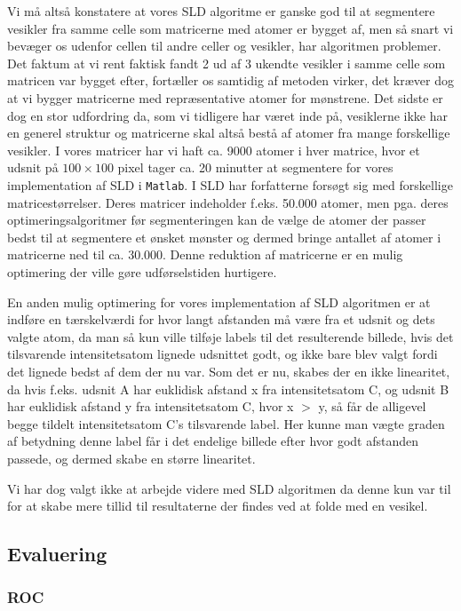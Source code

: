 Vi må altså konstatere at vores SLD algoritme er ganske god til at segmentere vesikler fra samme celle som matricerne med atomer er bygget af, men så snart vi bevæger os udenfor cellen til andre celler og vesikler, har algoritmen problemer. Det faktum at vi rent faktisk fandt 2 ud af 3 ukendte vesikler i samme celle som matricen var bygget efter, fortæller os samtidig af metoden virker, det kræver dog at vi bygger matricerne med repræsentative atomer for mønstrene. Det sidste er dog en stor udfordring da, som vi tidligere har været inde på, vesiklerne ikke har en generel struktur og matricerne skal altså bestå af atomer fra mange forskellige vesikler. I vores matricer har vi haft ca. 9000 atomer i hver matrice, hvor et udsnit på $100\times100$ pixel tager ca. 20 minutter at segmentere for vores implementation af SLD i \texttt{Matlab}. I SLD har forfatterne forsøgt sig med forskellige matricestørrelser. Deres matricer indeholder f.eks. 50.000 atomer, men pga. deres optimeringsalgoritmer før segmenteringen kan de vælge de atomer der passer bedst til at segmentere et ønsket mønster og dermed bringe antallet af atomer i matricerne ned til ca. 30.000. Denne reduktion af matricerne er en mulig optimering der ville gøre udførselstiden hurtigere. 

En anden mulig optimering for vores implementation af SLD algoritmen er at indføre en tærskelværdi for hvor langt afstanden må være fra et udsnit og dets valgte atom, da man så kun ville tilføje labels til det resulterende billede, hvis det tilsvarende intensitetsatom lignede udsnittet godt, og ikke bare blev valgt fordi det lignede bedst af dem der nu var. Som det er nu, skabes der en ikke linearitet, da hvis f.eks. udsnit A har euklidisk afstand x fra intensitetsatom C, og udsnit B har euklidisk afstand y fra intensitetsatom C, hvor x $>$ y, så får de alligevel begge tildelt intensitetsatom C's tilsvarende label. Her kunne man vægte graden af betydning denne label får i det endelige billede efter hvor godt afstanden passede, og dermed skabe en større linearitet. 

Vi har dog valgt ikke at arbejde videre med SLD algoritmen da denne kun var til for at skabe mere tillid til resultaterne der findes ved at folde med en vesikel. %

\subsection{Evaluering}
\subsubsection{ROC}
